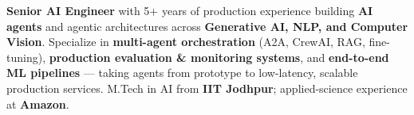 \documentclass[letter,10pt]{article}
\begin{document}

\textbf{Senior AI Engineer} with 5+ years of production experience building \textbf{AI agents} and agentic architectures across \textbf{Generative AI, NLP, and Computer Vision}.
Specialize in \textbf{multi-agent orchestration} (A2A, CrewAI, RAG, fine-tuning), \textbf{production evaluation \& monitoring systems}, and \textbf{end-to-end ML pipelines} — taking agents from prototype to low-latency, scalable production services.
M.Tech in AI from \textbf{IIT Jodhpur}; applied-science experience at \textbf{Amazon}.
\end{document}
